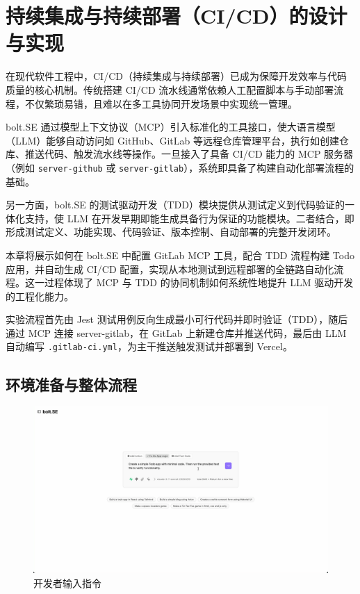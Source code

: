 
\chapter{持续集成与持续部署（CI/CD）的设计与实现}
\label{chap:mcp-tdd-cicd}

在现代软件工程中，CI/CD（持续集成与持续部署）已成为保障开发效率与代码质量的核心机制。传统搭建 CI/CD 流水线通常依赖人工配置脚本与手动部署流程，不仅繁琐易错，且难以在多工具协同开发场景中实现统一管理。

bolt.SE 通过模型上下文协议（MCP）引入标准化的工具接口，使大语言模型（LLM）能够自动访问如 GitHub、GitLab 等远程仓库管理平台，执行如创建仓库、推送代码、触发流水线等操作。一旦接入了具备 CI/CD 能力的 MCP 服务器（例如 \texttt{server-github} 或 \texttt{server-gitlab}），系统即具备了构建自动化部署流程的基础。

另一方面，bolt.SE 的测试驱动开发（TDD）模块提供从测试定义到代码验证的一体化支持，使 LLM 在开发早期即能生成具备行为保证的功能模块。二者结合，即形成测试定义、功能实现、代码验证、版本控制、自动部署的完整开发闭环。

本章将展示如何在 bolt.SE 中配置 GitLab MCP 工具，配合 TDD 流程构建 Todo 应用，并自动生成 CI/CD 配置，实现从本地测试到远程部署的全链路自动化流程。这一过程体现了 MCP 与 TDD 的协同机制如何系统性地提升 LLM 驱动开发的工程化能力。

实验流程首先由 Jest 测试用例反向生成最小可行代码并即时验证（TDD），随后通过 MCP 连接 server-gitlab，在 GitLab 上新建仓库并推送代码，最后由 LLM 自动编写 \texttt{.gitlab-ci.yml}，为主干推送触发测试并部署到 Vercel。

\section{环境准备与整体流程}
\label{sec:cicd-overview}

\begin{figure}[H]
    \centering
    \includegraphics[width=\textwidth]{figures/screenshots/ci-cd/ci_prompt.png}
    \caption{开发者输入指令}
    \label{fig:ci_prompt}
\end{figure}

